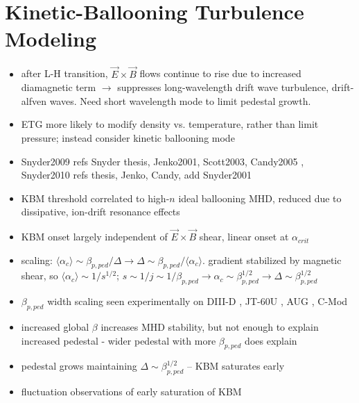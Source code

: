 \nicesectionending

\section{Kinetic-Ballooning Turbulence Modeling}\label{sec:mod_turbulence}

\begin{itemize}
 \item after L-H transition, $\vec{E}\times\vec{B}$ flows continue to rise due to increased diamagnetic term $\rightarrow$ suppresses long-wavelength drift wave turbulence, drift-alfven waves.  Need short wavelength mode to limit pedestal growth. \cite{Snyder2009}
 \item ETG more likely to modify density vs. temperature, rather than limit pressure; instead consider kinetic ballooning mode \cite{Snyder2009}
 \item Snyder2009 refs Snyder thesis, Jenko2001, Scott2003, Candy2005 \cite{Snyder1999,Jenko2001,Scott2003,Candy2005}, Snyder2010 refs thesis, Jenko, Candy, add Snyder2001 \cite{Snyder2001}
 \item KBM threshold correlated to high-$n$ ideal ballooning MHD, reduced due to dissipative, ion-drift resonance effects \cite{Snyder2009}
 \item KBM onset largely independent of $\vec{E} \times \vec{B}$ shear, linear onset at $\alpha_{crit}$ \cite{Snyder2009}
 \item scaling: $\langle \alpha_c \rangle \sim \beta_{p,ped} / \Delta \rightarrow \Delta \sim \beta_{p,ped}/\langle \alpha_c \rangle$.  gradient stabilized by magnetic shear, so $\langle \alpha_c \rangle \sim 1/s^{1/2}$; $s \sim 1/j \sim 1/\beta_{p,ped} \rightarrow \alpha_c \sim \beta_{p,ped}^{1/2} \rightarrow \Delta \sim \beta_{p,ped}^{1/2}$ \cite{Snyder2009}
 \item $\beta_{p,ped}$ width scaling seen experimentally on DIII-D \cite{Osborne1998,Groebner2013}, JT-60U \cite{Oyama2005,Urano2008}, AUG \cite{Gruber1999,Beurskens2011}, C-Mod \cite{LaBombard2008,Walk2012}
 \item increased global $\beta$ increases MHD stability, but not enough to explain increased pedestal - wider pedestal with more $\beta_{p,ped}$ does explain \cite{Snyder2009a}
 \item pedestal grows maintaining $\Delta \sim \beta_{p,ped}^{1/2}$ -- KBM saturates early \cite{Maggi2010,Hughes2013}
 \item fluctuation observations of early saturation of KBM \cite{Diallo2014}
\end{itemize}

